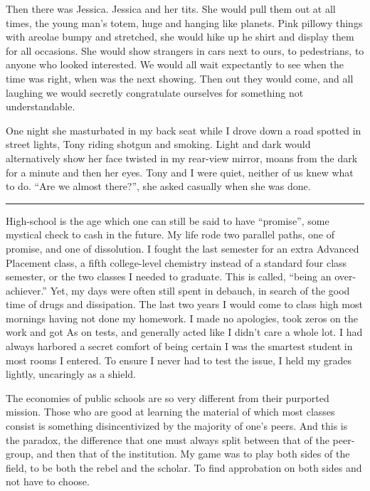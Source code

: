 \documentclass[ebook, 10pt, openright, onecolumn]{memoir}
\newcommand*\starbreak{\fancybreak*{\Large{* * *}}}
\begin{document}
Then there was Jessica. Jessica and her tits.  She would pull them out at all
times, the young man's totem, huge and hanging like planets.  Pink pillowy
things with areolae bumpy and stretched, she would hike up he shirt and display
them for all occasions.  She would show strangers in cars next to ours, to
pedestrians, to anyone who looked interested.  We would all wait expectantly to
see when the time was right, when was the next showing. Then out they would
come, and all laughing we would secretly congratulate ourselves for something
not understandable.

One night she masturbated in my back seat while I drove down a road spotted in
street lights, Tony riding shotgun and smoking.  Light and dark would
alternatively show her face twisted in my rear-view mirror, moans from the dark
for a minute and then her eyes.  Tony and I were quiet, neither of us knew what
to do.  ``Are we almost there?'', she asked casually when she was done.

\starbreak



High-school is the age which one can still be said to have ``promise'', some
mystical check to cash in the future.  My life rode two parallel paths, one of
promise, and one of dissolution.  I fought the last semester for an extra
Advanced Placement class, a fifth college-level chemistry instead of a standard
four class semester, or the two classes I needed to graduate. This is called,
``being an over-achiever.''  Yet, my days were often still spent in debauch, in
search of the good time of drugs and dissipation.  The last two years I would
come to class high most mornings having not done my homework.  I made no
apologies, took zeros on the work and got As on tests, and generally acted like
I didn't care a whole lot.  I had always harbored a secret comfort of being
certain I was the smartest student in most rooms I entered.  To ensure I never
had to test the issue, I held my grades lightly, uncaringly as a shield.

The economies of public schools are so very different from their purported
mission.  Those who are good at learning the material of which most classes
consist is something disincentivized by the majority of one's peers.  And this
is the paradox, the difference that one must always split between that of the
peer-group, and then that of the institution.  My game was to play both sides of
the field, to be both the rebel and the scholar.  To find approbation on both
sides and not have to choose.
\end{document}
